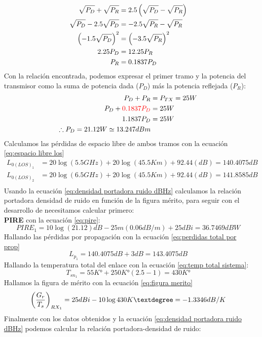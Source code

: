 \documentclass[
	12pt, %
	fleqn, %
	a4paper, %
	oneside, %
]{LegrandOrangeBook}
\begin{document}
\begin{example}
\begin{align*}
\sqrt{P_D}+\sqrt{P_R}&=2.5\left(\sqrt{P_D}-\sqrt{P_R}\right)\\
\sqrt{P_D}-2.5\sqrt{P_D}&=-2.5\sqrt{P_R}-\sqrt{P_R}\\
\left(-1.5\sqrt{P_D}\right)^2&=\left(-3.5\sqrt{P_R}\right)^2\\
2.25P_D&=12.25P_R\\
P_R&=0.1837P_D
\end{align*}
Con la relación encontrada, podemos expresar el primer tramo y la potencia del transmisor como la suma de potencia dada ($P_D$) más la potencia reflejada ($P_R$):
\begin{align*}
P_D+P_R&=P_{TX}=25W\\
P_D+\textcolor{red}{0.1837P_D}&=25W\\
1.1837P_D&=25W\\
\therefore P_D=21.12W\simeq 13.247 dBm
\end{align*}
Calculamos las pérdidas de espacio libre de ambos tramos con la ecuación \ref{eq:espacio libre los}
\begin{align*}
L_{0(LOS)_1}&=20\log(5.5GHz)+20\log(45.5Km)+92.44(dB)=140.4075 dB\\
L_{0(LOS)_2}&=20\log(6.5GHz)+20\log(45.5Km)+92.44(dB)=141.8585 dB\\
\end{align*}
Usando la ecuación \ref{eq:densidad portadora ruido dBHz} calculamos la relación portadora densidad de ruido en función de la figura mérito, para seguir con el desarrollo de necesitamos calcular primero:\\
\textbf{PIRE} con la ecuación \ref{eq:pire}:
\begin{displaymath}
PIRE_1=10\log(21.12)dB-25m(0.06dB/m)+25dBi=36.7469 dBW
\end{displaymath}
Hallando las pérdidas por propagación con la ecuación \ref{eq:perdidas total por prop}
\begin{displaymath}
L_{p_1}=140.4075 dB+3 dB=143.4075 dB
\end{displaymath}
Hallando la temperatura total del enlace con la ecuación \ref{eq:temp total sistema}:
\begin{displaymath}
T_{sn_1}=55K°+250K°(2.5-1)=430 K°
\end{displaymath}
Hallamos la figura de mérito con la ecuación \ref{eq:figura merito}
\begin{displaymath}
\parentesis{\frac{G_r}{T_s}}_{RX_1}=25dBi-10\log 430K°=-1.3346 dB/K
\end{displaymath}
Finalmente con los datos obtenidos y la ecuación \ref{eq:densidad portadora ruido dBHz} podemos calcular la relación portadora-densidad de ruido:

\end{example}
\end{document}
